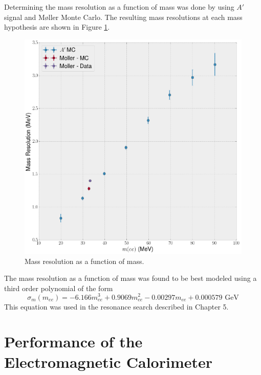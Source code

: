 Determining the mass resolution as a function of mass was done by using $A'$ 
signal and M\o ller Monte Carlo. The resulting mass resolutions at each mass 
hypothesis are shown in Figure \ref{fig:mass_resolution}. 
\begin{figure}[h!t]
    \centering
    \includegraphics[width=.8\textwidth]{images/invariant_mass_curve.png}
    \caption{Mass resolution as a function of mass.}
    \label{fig:mass_resolution}
\end{figure}
The mass resolution as a function of mass was found to be best modeled using
a third order polynomial of the form
\begin{equation}
    \sigma_{m}(m_{ee}) = -6.166 m_{ee}^3 + 0.9069 m_{ee}^2 - 0.00297 m_{ee} + 0.000579 \text{ GeV}
\end{equation}
This equation was used in the resonance search described in Chapter 5. 

\section{Performance of the Electromagnetic Calorimeter}

